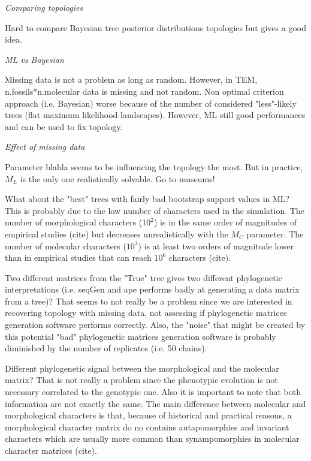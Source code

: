 \documentclass[12pt,letterpaper]{article}
\renewcommand{\subsection}[1]{%
\bigskip
\begin{center}
\begin{large}
\normalfont\itshape #1
\end{large}
\end{center}}
\begin{document}
\subsection{Comparing topologies}
Hard to compare Bayesian tree posterior distributions topologies but gives a good idea.

\subsection{ML vs Bayesian}
Missing data is not a problem as long as random. However, in TEM, n.fossils*n.molecular data is missing and not random.
Non optimal criterion approach (i.e. Bayesian) worse because of the number of considered "less"-likely trees (flat maximum likelihood landscapes).
However, ML still good performances and can be used to fix topology.

\subsection{Effect of missing data}
Parameter blabla seems to be influencing the topology the most.
But in practice, $M_L$ is the only one realistically solvable. Go to museums!

What about the "best" trees with fairly bad bootstrap support values in ML?
This is probably due to the low number of characters used in the simulation.
The number of morphological characters ($10^2$) is in the same order of magnitudes of empirical studies (cite) but decreases unrealistically with the $M_C$ parameter. %
The number of molecular characters ($10^3$) is at least two orders of magnitude lower than in empirical studies that can reach $10^6$ characters (cite).

Two different matrices from the "True" tree gives two different phylogenetic interpretations (i.e. seqGen and ape performs badly at generating a data matrix from a tree)?
That seems to not really be a problem since we are interested in recovering topology with missing data, not assessing if phylogenetic matrices generation software performs correctly.
Also, the "noise" that might be created by this potential "bad" phylogenetic matrices generation software is probably diminished by the number of replicates (i.e. 50 chains).

Different phylogenetic signal between the morphological and the molecular matrix?
That is not really a problem since the phenotypic evolution is not necessary correlated to the genotypic one.
Also it is important to note that both information are not exactly the same.
The main difference between molecular and morphological characters is that, because of historical and practical reasons, a morphological character matrix do no contains autapomorphies and invariant characters which are usually more common than synampomorphies in molecular character matrices (cite).
\end{document}
